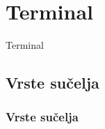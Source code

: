 \documentclass{beamer}
\begin{document}
\section{Terminal}
\begin{frame}[c]
  \begin{center}
    \begin{Huge}
      Terminal
    \end{Huge}
  \end{center}
\end{frame}

\subsection{Vrste sučelja}

\begin{frame}[t]
\frametitle{Vrste sučelja}
  \begin{columns}
    \begin{column}{.7\textwidth}
      

\end{column}
\end{columns}
\end{frame}
\end{document}
